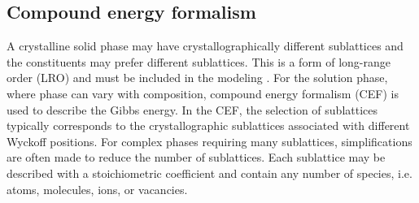\subsection{Compound energy formalism} \label{method:ssec:CEF}
A crystalline solid phase may have crystallographically different sublattices and the constituents may prefer different sublattices. This is a form of long-range order (LRO) and must be included in the modeling \cite{lukas2007computational}. For the solution phase, where phase can vary with composition, compound energy formalism (CEF) \cite{hillert1970regular, sundman1981regular} is used to describe the Gibbs energy. In the CEF, the selection of sublattices typically corresponds to the crystallographic sublattices associated with different Wyckoff positions. For complex phases requiring many sublattices, simplifications are often made to reduce the number of sublattices. Each sublattice may be described with a stoichiometric coefficient and contain any number of species, i.e. atoms, molecules, ions, or vacancies. 

